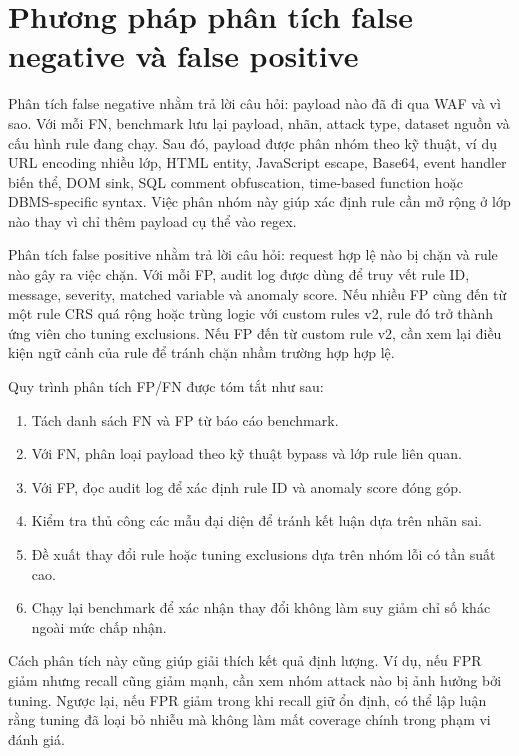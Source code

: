 \section{Phương pháp phân tích false negative và false positive}
\label{sec:fn-fp-analysis-method}

Phân tích false negative nhằm trả lời câu hỏi: payload nào đã đi qua WAF và vì sao. Với mỗi FN, benchmark lưu lại payload, nhãn, attack type, dataset nguồn và cấu hình rule đang chạy. Sau đó, payload được phân nhóm theo kỹ thuật, ví dụ URL encoding nhiều lớp, HTML entity, JavaScript escape, Base64, event handler biến thể, DOM sink, SQL comment obfuscation, time-based function hoặc DBMS-specific syntax. Việc phân nhóm này giúp xác định rule cần mở rộng ở lớp nào thay vì chỉ thêm payload cụ thể vào regex.

Phân tích false positive nhằm trả lời câu hỏi: request hợp lệ nào bị chặn và rule nào gây ra việc chặn. Với mỗi FP, audit log được dùng để truy vết rule ID, message, severity, matched variable và anomaly score. Nếu nhiều FP cùng đến từ một rule CRS quá rộng hoặc trùng logic với custom rules v2, rule đó trở thành ứng viên cho tuning exclusions. Nếu FP đến từ custom rule v2, cần xem lại điều kiện ngữ cảnh của rule để tránh chặn nhầm trường hợp hợp lệ.

Quy trình phân tích FP/FN được tóm tắt như sau:

\begin{enumerate}
    \item Tách danh sách FN và FP từ báo cáo benchmark.
    \item Với FN, phân loại payload theo kỹ thuật bypass và lớp rule liên quan.
    \item Với FP, đọc audit log để xác định rule ID và anomaly score đóng góp.
    \item Kiểm tra thủ công các mẫu đại diện để tránh kết luận dựa trên nhãn sai.
    \item Đề xuất thay đổi rule hoặc tuning exclusions dựa trên nhóm lỗi có tần suất cao.
    \item Chạy lại benchmark để xác nhận thay đổi không làm suy giảm chỉ số khác ngoài mức chấp nhận.
\end{enumerate}

Cách phân tích này cũng giúp giải thích kết quả định lượng. Ví dụ, nếu FPR giảm nhưng recall cũng giảm mạnh, cần xem nhóm attack nào bị ảnh hưởng bởi tuning. Ngược lại, nếu FPR giảm trong khi recall giữ ổn định, có thể lập luận rằng tuning đã loại bỏ nhiễu mà không làm mất coverage chính trong phạm vi đánh giá.

